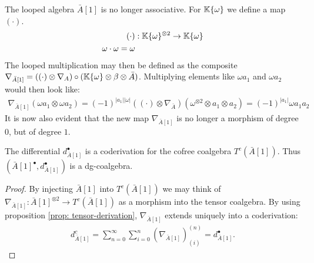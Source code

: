 \documentclass[../thesis.tex]{subfiles}
\begin{document}
            The looped algebra $\bar{A}[1]$ is no longer associative. For $\mathbb{K}\{\omega\}$ we define a map $(\cdot)$. 
            \begin{align*}
                (\cdot) & : \mathbb{K}\{\omega\}^{\otimes 2} \rightarrow \mathbb{K}\{\omega\} \\
                \omega \cdot \omega = \omega
            \end{align*}
            The looped multiplication may then be defined as the composite $\nabla_{\bar{A}[1]} = ((\cdot) \otimes \nabla_A) \circ (\mathbb{K}\{\omega\} \otimes \beta \otimes \bar{A})$. Multiplying elements like $\omega a_1$ and $\omega a_2$ would then look like:
            \begin{align*}
                \nabla_{\bar{A}[1]}(\omega a_1 \otimes \omega a_2) = (-1)^{|a_1||\omega|}((\cdot) \otimes \nabla_{\bar{A}})(\omega^{\otimes 2} \otimes a_1 \otimes a_2) = (-1)^{|a_1|}\omega a_1 a_2
            \end{align*}
            It is now also evident that the new map $\nabla_{\bar{A}[1]}$ is no longer a morphism of degree $0$, but of degree $1$.

            \begin{proposition}\label{prop: a-to-dgc}
                The differential $d_{\bar{A}[1]}^\bullet$ is a coderivation for the cofree coalgebra $T^c(\bar{A}[1])$. Thus $(\bar{A}[1]^\bullet, d_{\bar{A}[1]}^\bullet)$ is a dg-coalgebra.
            \end{proposition}

            \begin{proof}
                By injecting $\bar{A}[1]$ into $T^c(\bar{A}[1])$ we may think of $\nabla_{\bar{A}[1]} : \bar{A}[1]^{\otimes 2} \rightarrow T^c(\bar{A}[1])$ as a morphism into the tensor coalgebra. By using proposition \ref{prop: tensor-derivation}, $\nabla_{\bar{A}[1]}$ extends uniquely into a coderivation:
                \begin{align*}
                    d_{\bar{A}[1]}^c = \sum_{n=0}^{\infty}\sum_{i=0}^n(\nabla_{\bar{A}[1]})_{(i)}^{(n)} = d_{\bar{A}[1]}^\bullet\text{.}
                \end{align*}
            \end{proof}
\end{document}

